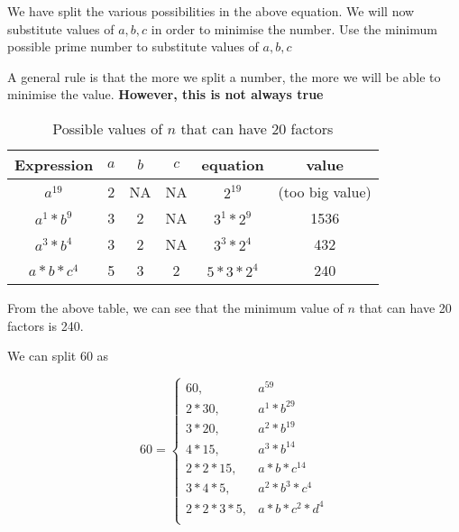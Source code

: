 We have split the various possibilities in the above equation. We will now substitute values of $a,b,c$ in order to minimise the number. Use the minimum possible prime number to substitute values of $a,b,c$

\begin{NOTE}
    A general rule is that the more we split a number, the more we will be able to minimise the value. \textbf{However, this is not always true}
\end{NOTE}


\begin{table}[h!]
    \centering
    \begin{tabular}{|| c | c | c | c | c | c ||}
        \hline
         Expression & $a$ & $b$ & $c$ & equation & value  \\
        \hline
         $a^{19}$ & 2 & NA & NA & $2^{19}$ & (too big value) \\
        \hline
         $a^1 * b^9$ & 3 & 2 & NA & $3^1 * 2^9 $ & 1536 \\
        \hline
         $a^3 * b^4$ & 3 & 2 & NA & $3^3 * 2^4 $ & 432 \\
        \hline
         $a * b * c^4 $ & 5 & 3 & 2 & $ 5 * 3 * 2^4 $ & 240 \\
        \hline
    \end{tabular}
    \caption{Possible values of $n$ that can have 20 factors}
\end{table}

From the above table, we can see that the minimum value of $n$ that can have 20 factors is 240.


We can split 60 as 

\begin{equation*}
    60 = 
    \begin{cases}
        60, & a^{59} \\
        2 * 30, & a^{1} * b^{29} \\
        3 * 20, & a^{2} * b^{19} \\
        4 * 15, & a^{3} * b^{14} \\
        2 * 2 * 15, & a * b * c^{14} \\
        3 * 4 * 5, & a^2 * b^3 * c^4 \\
        2 * 2 * 3 * 5, & a * b * c^2 * d^4 \\
    \end{cases}
\end{equation*}

